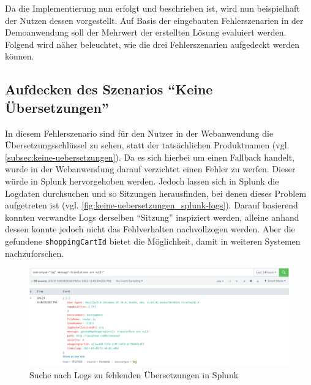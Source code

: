 
Da die Implementierung nun erfolgt und beschrieben ist, wird nun beispielhaft der Nutzen dessen vorgestellt. Auf Basis der eingebauten Fehlerszenarien in der Demoanwendung soll der Mehrwert der erstellten Lösung evaluiert werden. Folgend wird näher beleuchtet, wie die drei Fehlerszenarien aufgedeckt werden können.

\subsection{Aufdecken des Szenarios \enquote{Keine Übersetzungen}}

In diesem Fehlerszenario sind für den Nutzer in der Webanwendung die Übersetzungsschlüssel zu sehen, statt der tatsächlichen Produktnamen (vgl. \autoref{subsec:keine-uebersetzungen}). Da es sich hierbei um einen Fallback handelt, wurde in der Webanwendung darauf verzichtet einen Fehler zu werfen. Dieser würde in Splunk hervorgehoben werden. Jedoch lassen sich in Splunk die Logdaten durchsuchen und so Sitzungen herausfinden, bei denen dieses Problem aufgetreten ist (vgl. \autoref{fig:keine-uebersetzungen_splunk-logs}). Darauf basierend konnten verwandte Logs derselben \enquote{Sitzung} inspiziert werden, alleine anhand dessen konnte jedoch nicht das Fehlverhalten nachvollzogen werden. Aber die gefundene \texttt{shoppingCartId} bietet die Möglichkeit, damit in weiteren Systemen nachzuforschen.

\begin{figure}[H]
	\centering
	\includegraphics[width=1.00\linewidth]{img/05_ergebnis/keine-uebersetzungen_splunk-logs.png}
	\caption{Suche nach Logs zu fehlenden Übersetzungen in Splunk}
	\label{fig:keine-uebersetzungen_splunk-logs}
\end{figure}

